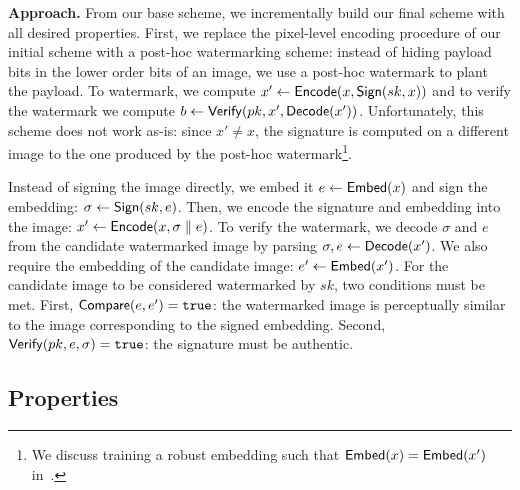 \documentclass[12pt]{article}
\begin{document}
\textbf{Approach.} 
From our base scheme, we incrementally build our final scheme with all desired properties.
First, we replace the pixel-level encoding procedure of our initial scheme with a post-hoc watermarking scheme: instead of hiding payload bits in the lower order bits of an image, we use a post-hoc watermark to plant the payload.
To watermark, we compute $x' \gets \mathsf{Encode}(x, \mathsf{Sign}(sk, x))$ and to verify the watermark we compute $b \gets \mathsf{Verify}(pk, x', \mathsf{Decode}(x'))$.
Unfortunately, this scheme does not work as-is: since $x' \neq x$, the signature is computed on a different image to the one produced by the post-hoc watermark\footnote{We discuss training a robust embedding such that $\mathsf{Embed}(x) = \mathsf{Embed}(x')$ in~.}.

Instead of signing the image directly, we embed it $e \gets \mathsf{Embed}(x)$ and sign the embedding: $\sigma \gets \mathsf{Sign}(sk, e)$.
Then, we encode the signature and embedding into the image: $x' \gets \mathsf{Encode}(x, \sigma \parallel e)$.
To verify the watermark, we decode $\sigma$ and $e$ from the candidate watermarked image by parsing $\sigma, e \gets \mathsf{Decode}(x')$.
We also require the embedding of the candidate image: $e' \gets \mathsf{Embed}(x')$.
For the candidate image to be considered watermarked by $sk$, two conditions must be met.
First, $\mathsf{Compare}(e, e') = \mathtt{true}$: the watermarked image is perceptually similar to the image corresponding to the signed embedding.
Second, $\mathsf{Verify}(pk, e, \sigma) = \mathtt{true}$: the signature must be authentic.

\subsection{Properties}
\end{document}
